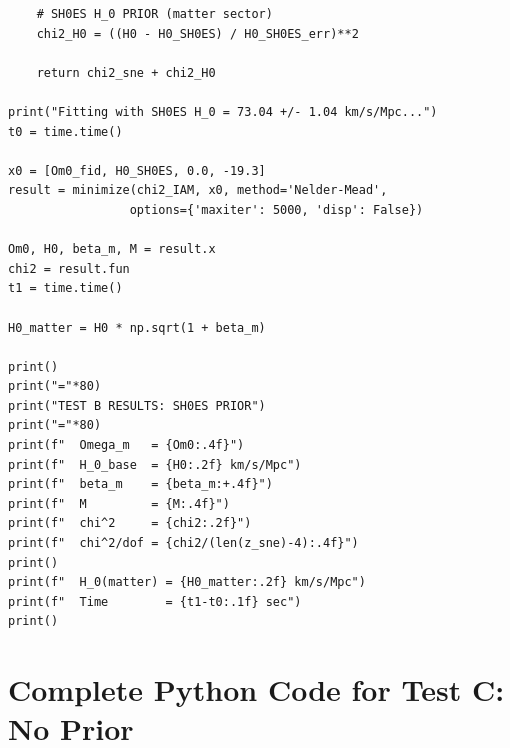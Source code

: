 \documentclass[twocolumn,superscriptaddress,prd,amsmath,amssymb]{revtex4-2}
\begin{document}
\begin{lstlisting}
    # SH0ES H_0 PRIOR (matter sector)
    chi2_H0 = ((H0 - H0_SH0ES) / H0_SH0ES_err)**2
    
    return chi2_sne + chi2_H0

print("Fitting with SH0ES H_0 = 73.04 +/- 1.04 km/s/Mpc...")
t0 = time.time()

x0 = [Om0_fid, H0_SH0ES, 0.0, -19.3]
result = minimize(chi2_IAM, x0, method='Nelder-Mead',
                 options={'maxiter': 5000, 'disp': False})

Om0, H0, beta_m, M = result.x
chi2 = result.fun
t1 = time.time()

H0_matter = H0 * np.sqrt(1 + beta_m)

print()
print("="*80)
print("TEST B RESULTS: SH0ES PRIOR")
print("="*80)
print(f"  Omega_m   = {Om0:.4f}")
print(f"  H_0_base  = {H0:.2f} km/s/Mpc")
print(f"  beta_m    = {beta_m:+.4f}")
print(f"  M         = {M:.4f}")
print(f"  chi^2     = {chi2:.2f}")
print(f"  chi^2/dof = {chi2/(len(z_sne)-4):.4f}")
print()
print(f"  H_0(matter) = {H0_matter:.2f} km/s/Mpc")
print(f"  Time        = {t1-t0:.1f} sec")
print()
\end{lstlisting}

\section{Complete Python Code for Test C: No Prior}
\label{app:test_c}
\end{document}
